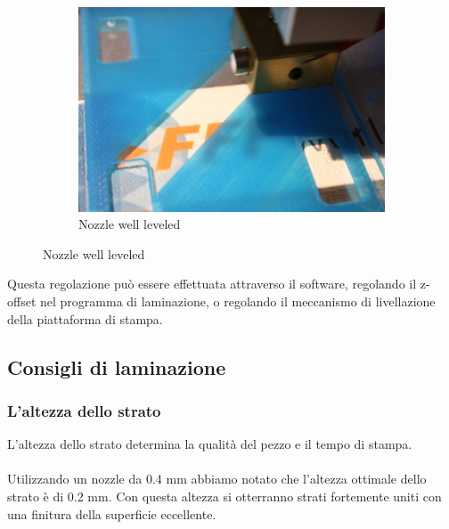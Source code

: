 \documentclass[11pt,a4paper]{article}
\begin{document}
\begin{figure}[H]
\begin{subfigure}[b]{0.3\textwidth}
        \includegraphics[width=\textwidth,cfbox=azul_marcos 3pt 0pt]{FOTOS/HOTENDPERFECTO}
	\caption*{Nozzle well leveled}
    \end{subfigure}
\end{figure}
Questa regolazione può essere effettuata attraverso il software, regolando il z-offset nel programma di laminazione, o regolando il meccanismo di livellazione della piattaforma di stampa.
	\subsection{Consigli di laminazione}
		\subsubsection{L'altezza dello strato}
L'altezza dello strato determina la qualità del pezzo e il tempo di stampa.
\\\\
Utilizzando un nozzle da 0.4 mm abbiamo notato che l'altezza ottimale dello strato è di 0.2 mm. Con questa altezza si otterranno strati fortemente uniti con una finitura della superficie eccellente.
\end{document}
